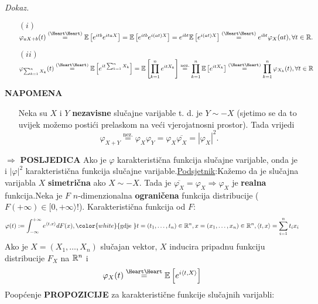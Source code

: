 \documentclass{article}
\begin{document}
\textit{Dokaz.}
\begin{enumerate}
    \item[\((i)\)] \(\varphi_{aX+b}(t)\overset{\text{(\Heart\Heart)}}{=}\Bbb E\left[e^{itb}e^{itaX}\right]=\Bbb E\left[e^{itb}e^{i(at)X}\right]=e^{ibt}\Bbb E\left[e^{i(at)X}\right]\overset{\text{(\Heart\Heart)}}{=}e^{ibt}\varphi_X(at),\forall t\in\Bbb R.\) 
    \item[\((ii)\)] \(\displaystyle\varphi_{\sum_{k=1}^nX_k}(t)\overset{\text{(\Heart\Heart)}}{=}\Bbb E\left[e^{it\sum_{k=1}^nX_k}\right]=\Bbb E\left[\prod_{k=1}^ne^{itX_k}\right]\overset{\text{nez.}}{=}\prod_{k=1}^n\Bbb E\left[e^{itX_k}\right]\overset{\text{(\Heart\Heart)}}{=}\prod_{k=1}^n\varphi_{X_k}(t),\forall t\in\Bbb R\)
\end{enumerate}
\textbf{NAPOMENA}
\begin{itemize}
    \item[\ding{113}] Neka su \(X\) i \(Y\) \textbf{nezavisne} slučajne varijable t. d. je \(Y\sim -X\) (sjetimo se da to uvijek možemo postići prelaskom na veći vjerojatnosni prostor). Tada vrijedi \[\varphi_{X+Y}\overset{\text{nez.}}{=}\varphi_X\varphi_Y=\varphi_X\overline{\varphi_X}=\left|\varphi_X\right|^2.\] 
\end{itemize}
\(\Rightarrow\) \textbf{POSLJEDICA} Ako je \(\varphi\) karakteristična funkcija slučajne varijable, onda je i \(|\varphi|^2\) karakteristična funkcija slučajne varijable.\newline\newline \underline{Podsjetnik}:\newline Kažemo da je slučajna varijabla \(X\) \textbf{simetrična} ako \(X\sim -X.\) Tada je \(\overline{\varphi_X}=\varphi_X\Rightarrow\varphi_X\) je \textbf{realna} funkcija.\newline\newline Neka je \(F\) \(n\)-dimenzionalna \textbf{ograničena} funkcija distribucije (\(F(+\infty)\in[0,+\infty\rangle\)!). Karakteristična funkcija od \(F:\) \[\varphi(t):=\int_{-\infty}^{+\infty}e^{\langle t,x\rangle}dF(x),{\color{white}{\text{gdje }}}t=(t_1,\ldots,t_n)\in\Bbb R^n,x=(x_1,\ldots,x_n)\in\Bbb R^n,\langle t,x\rangle=\sum_{i=1}^nt_ix_i\] Ako je \(X=(X_1,\ldots,X_n)\) slučajan vektor, \(X\) inducira pripadnu funkciju distribucije \(F_X\) na \(\Bbb R^n\)  i \[\varphi_X(t)\overset{\text{\Heart\Heart}}{=}\Bbb E\left[e^{i\langle t,X\rangle}\right]\]  Poopćenje \textbf{PROPOZICIJE} za karakteristične funkcije slučajnih varijabli:\newline\newline
\end{document}
